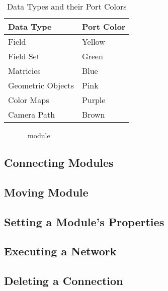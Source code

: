 \begin{table}[htbp]
  \begin{center}
    \begin{tabular}{|l|l|}
      \textbf{Data Type} & \textbf{Port Color} \\
      \hline
      Field & Yellow \\
      Field Set & Green \\
      Matricies & Blue \\
      Geometric Objects & Pink \\
      Color Maps & Purple \\
      Camera Path & Brown \\
      \hline
    \end{tabular}
    \caption{Data Types and their Port Colors}
    \label{tab:portcolors}
  \end{center}
\end{table}


\begin{figure}[htb]
  \begin{makeimage}
  \end{makeimage}
  \modgraphic
  \caption{\label{fig:module} \sr\ module}
\end{figure}


\subsection{Connecting Modules}
\label{sec:connectmods}



\subsection{Moving  Module}
\label{sec:movemod}


\subsection{Setting a Module's Properties}
\label{sec:setmodprops}


\subsection{Executing a Network}
\label{sec:executenet}


\subsection{Deleting a Connection}
\label{sec:deleteconnections}


